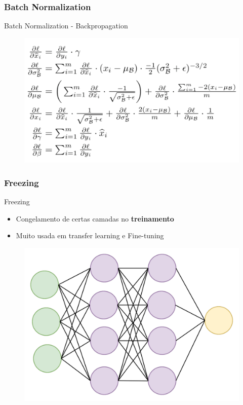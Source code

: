 \documentclass{beamer}
\begin{document}
\begin{frame}
	\frametitle{Batch Normalization}
	\begin{block}{Batch Normalization - Backpropagation}
		\begin{figure}
			\centering
			\includegraphics[width=1\linewidth]{figures/batch_norm_back.png}
		\end{figure}
	\end{block}
\end{frame}		
	
\begin{frame}
	\frametitle{Freezing}
	\begin{block}{Freezing}
		\begin{itemize}
			\item Congelamento de certas camadas no \textbf{treinamento}
			\item Muito usada em transfer learning e Fine-tuning
		\end{itemize}
		\begin{figure}
			\centering
			\includegraphics[width=0.7\linewidth]{figures/simple_nn.png}
		\end{figure}
	\end{block}
\end{frame}			
	
\end{document}
